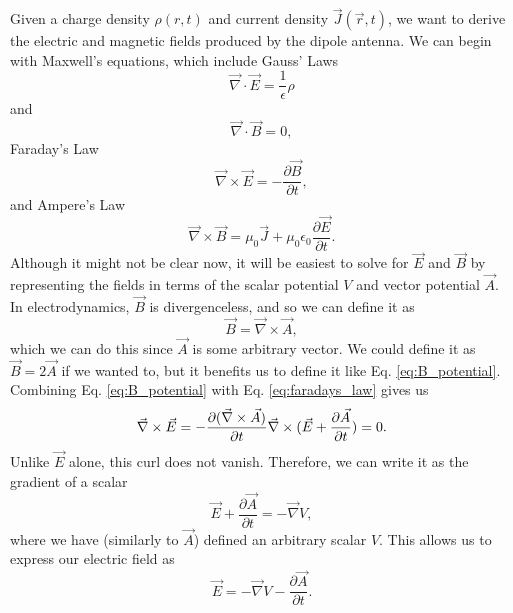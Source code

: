 \documentclass[10pt]{article}
\begin{document}
Given a charge density $\rho(r,t)$ and current density $\vec{J}(\vec{r},t)$, we want to derive the electric and magnetic fields produced by the dipole antenna. We can begin with Maxwell's equations, which include Gauss’ Laws
\begin{equation}
\vec{\nabla} \cdot \vec{E} = \frac{1}{\epsilon}\rho
    \label{eq:gauss_efield}
\end{equation}
and
\begin{equation}
\vec{\nabla} \cdot \vec{B} = 0,
    \label{eq:gauss_bfield}
\end{equation}
Faraday's Law
\begin{equation}
\vec{\nabla} \times \vec{E} = -\frac{\partial \vec{B}}{\partial t},
    \label{eq:faradays_law}
\end{equation}
and Ampere's Law
\begin{equation}
\vec{\nabla} \times \vec{B} = \mu_0\vec{J} + \mu_0\epsilon_0\frac{\partial \vec{E}}{\partial t}.
    \label{eq:amperes_law}
\end{equation}
Although it might not be clear now, it will be easiest to solve for $\vec{E}$ and $\vec{B}$ by representing the fields in terms of the scalar potential $V$ and vector potential $\vec{A}$. In electrodynamics, $\vec{B}$ is divergenceless, and so we can define it as
\begin{equation}
\vec{B} = \vec{\nabla} \times \vec{A},
    \label{eq:B_potential}
\end{equation}
which we can do this since $\vec{A}$ is some arbitrary vector\cite{griffiths_2019}. We could define it as $\vec{B} = 2\vec{A}$ if we wanted to, but it benefits us to define it like Eq. \ref{eq:B_potential}. Combining Eq. \ref{eq:B_potential} with Eq. \ref{eq:faradays_law} gives us
\begin{equation}
\vec{\nabla} \times \vec{E} = -\frac{\partial (\vec{\nabla} \times \vec{A})}{\partial t} \\
\vec{\nabla} \times (\vec{E} + \frac{\partial \vec{A}}{\partial t})= 0.
\end{equation}
Unlike $\vec{E}$ alone, this curl does not vanish. Therefore, we can write it as the gradient of a scalar
\begin{equation}
\vec{E} + \frac{\partial \vec{A}}{\partial t} = -\vec{\nabla}V,
\end{equation}
where we have (similarly to $\vec{A}$) defined an arbitrary scalar $V$. This allows us to express our electric field as 
\begin{equation}
\vec{E} = -\vec{\nabla} V - \frac{\partial \vec{A}}{\partial t}.
    \label{eq:E_potential}
\end{equation}
\end{document}
